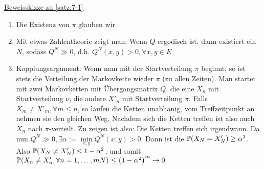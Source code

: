 	\underline{Beweisskizze zu \autoref{satz:7-1}} 
	\begin{enumerate}
		\item Die Existenz von $\pi$ glauben wir
		\item Mit etwas Zahlentheorie zeigt man: Wenn $Q$ ergodisch ist, dann existiert ein $N$, sodass $Q^N \gg 0$, d.h. $Q^N(x,y) > 0, \forall x,y \in E$
		\item Kopplungsargument: Wenn man mit der Startverteilung $\pi$ beginnt, so ist stets die Verteilung der Markovkette wieder $\pi$ (zu allen Zeiten). Man startet mit zwei Markovketten mit Übergangsmatrix $Q$, die eine $X_n$ mit Startverteilung $\nu$, die andere $X'_n$ mit Startverteilung $\pi$. Falls $X_m \neq X'_m, \forall m \leq n$, so laufen die Ketten unabhänig, vom Treffzeitpunkt an nehmen sie den gleichen Weg. Nachdem sich die Ketten treffen ist also auch $X_n$ nach $\pi$-verteilt. Zu zeigen ist also: Die Ketten treffen sich irgendwann. Da nun $Q^N \gg 0, \exists \alpha := \min\limits_{x,y} Q^N(x,y) > 0$. Dann ist die $\propE{X_N = X'_N} \geq \alpha^2$. Also $\propE{X_N \neq X'_N} \leq 1- \alpha^2$, und somit $\propE{X_n \neq X'_n, \forall n = 1, \dots, mN} \leq \enb{1- \alpha^2}^m \to 0.$
	\end{enumerate}

